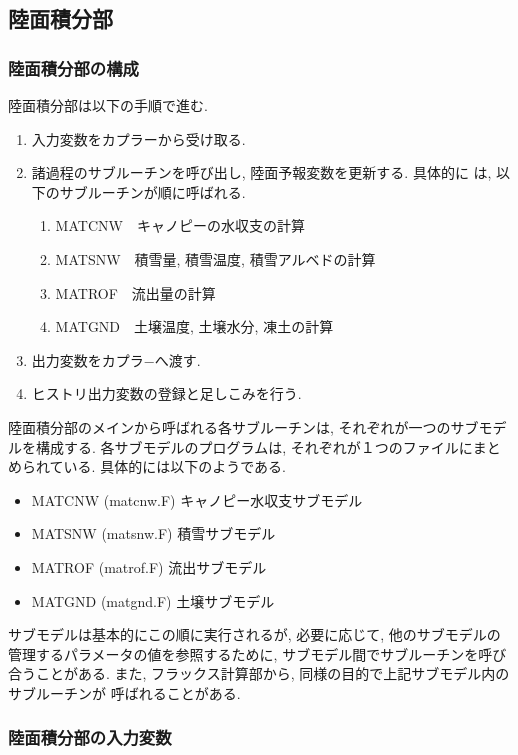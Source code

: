 \subsection{陸面積分部}

\subsubsection{陸面積分部の構成}

陸面積分部は以下の手順で進む.
\begin{enumerate}
 \item 入力変数をカプラーから受け取る.
 \item 諸過程のサブルーチンを呼び出し, 陸面予報変数を更新する. 具体的に
       は, 以下のサブルーチンが順に呼ばれる.
   \begin{enumerate}
    \item MATCNW\ \ キャノピーの水収支の計算
    \item MATSNW\ \ 積雪量, 積雪温度, 積雪アルベドの計算
    \item MATROF\ \ 流出量の計算
    \item MATGND\ \ 土壌温度, 土壌水分, 凍土の計算
   \end{enumerate}
 \item 出力変数をカプラ−へ渡す.
 \item ヒストリ出力変数の登録と足しこみを行う.
\end{enumerate}

陸面積分部のメインから呼ばれる各サブルーチンは, それぞれが一つのサブモデ
ルを構成する. 各サブモデルのプログラムは, それぞれが１つのファイルにまと
められている. 具体的には以下のようである.

\begin{itemize}
 \item MATCNW (matcnw.F) キャノピー水収支サブモデル
 \item MATSNW (matsnw.F) 積雪サブモデル
 \item MATROF (matrof.F) 流出サブモデル
 \item MATGND (matgnd.F) 土壌サブモデル
\end{itemize}

サブモデルは基本的にこの順に実行されるが, 必要に応じて, 他のサブモデルの
管理するパラメータの値を参照するために, サブモデル間でサブルーチンを呼び
合うことがある.
また, フラックス計算部から, 同様の目的で上記サブモデル内のサブルーチンが
呼ばれることがある.

\subsubsection{陸面積分部の入力変数}

